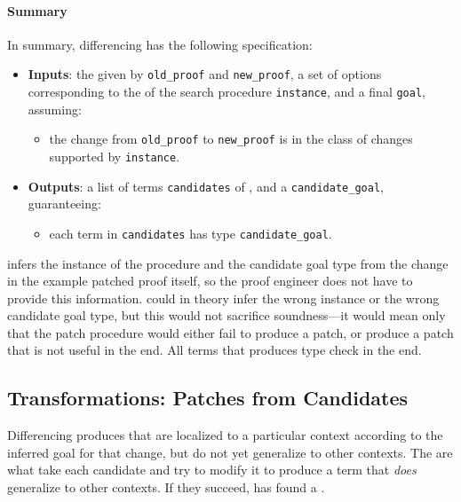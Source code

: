 \paragraph{Summary}
In summary, differencing has the following specification:

\begin{itemize}
\item \textbf{Inputs}: the  given by \lstinline{old_proof} and \lstinline{new_proof}, a set of options corresponding to the  of the search procedure \lstinline{instance}, and a final  \lstinline{goal}, assuming:
\begin{itemize}
\item the change from \lstinline{old_proof} to \lstinline{new_proof} is in the class of changes supported by \lstinline{instance}.
\end{itemize}
\item \textbf{Outputs}: a list of terms \lstinline{candidates} of , and a   \lstinline{candidate_goal}, guaranteeing:
\begin{itemize}
\item each term in \lstinline{candidates} has type \lstinline{candidate_goal}.
\end{itemize}
\end{itemize}
\sysname infers the instance of the procedure and the candidate goal type from the change in the example patched proof itself, so the proof engineer does not have to provide this information.
\sysname could in theory infer the wrong instance or the wrong candidate goal type, but this would not sacrifice soundness---it would mean only that
the patch procedure would either fail to produce a patch, or produce a patch that is not useful in the end.
All terms that \sysname produces type check in the end. %

\subsection{Transformations: Patches from Candidates}
\label{sec:pumpkin-spec-trans}

Differencing produces  that are localized to a particular context according to the inferred goal for that change,
but do not yet generalize to other contexts.
The  are what take each candidate and try to modify it to produce a term that \textit{does} generalize to other contexts.
If they succeed, \sysname has found a .

